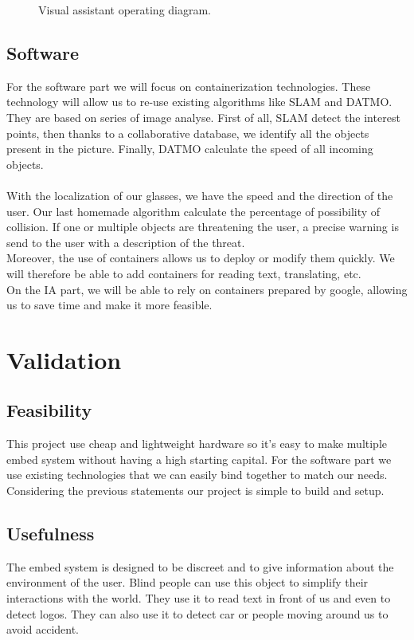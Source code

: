 \documentclass[conference,compsoc]{IEEEtran}
\begin{document}
\begin{figure}[h]
\centering
{}
\caption{Visual assistant operating diagram.}
\end{figure}

\subsection{Software}
For the software part we will focus on containerization technologies. These technology will allow us to re-use existing algorithms like SLAM and DATMO. They are based on series of image analyse. First of all, SLAM detect the interest points, then thanks to a collaborative database, we identify all the objects present in the picture. Finally, DATMO calculate the speed of all incoming objects.
\\
\\
With the localization of our glasses, we have the speed and the direction of the user. Our last homemade algorithm calculate the percentage of possibility of collision. If one or multiple objects are threatening the user, a precise warning is send to the user with a description of the threat.  
\\
Moreover, the use of containers allows us to deploy or modify them quickly.
We will therefore be able to add containers for reading text, translating, etc.
\\
On the IA part, we will be able to rely on containers prepared by google, allowing us to save time and make it more feasible.

\section{Validation}
\subsection{Feasibility}
This project use cheap and lightweight hardware so it's easy to make multiple embed system without having a high starting capital. For the software part we use existing technologies that we can easily bind together to match our needs. Considering the previous statements our project is simple to build and setup.

\subsection{Usefulness}
The embed system is designed to be discreet and to give information about the environment of the user. Blind people can use this object to simplify their interactions with the world. They use it to read text in front of us and even to detect logos. They can also use it to detect car or people moving around us to avoid accident.
\end{document}
